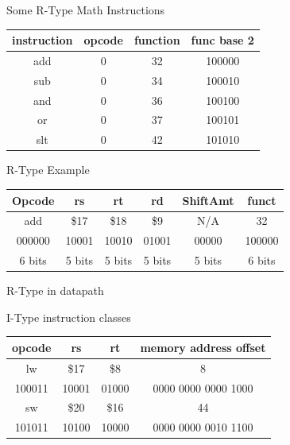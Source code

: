 \documentclass[landscape,fontscale=1,margin=0.2cm,paperwidth=60truecm, paperheight=34truecm,debug]{baposter}
\begin{document}
\begin{poster}
\begin{posterbox}[column=1,below=auto]{Some R-Type Math Instructions}
\begin{center}
\begin{tabular}{|c|c|c|c|}
\hline
instruction & opcode & function & func base 2\\\hline
add & 0 & 32 & 100000 \\\hline
sub & 0 & 34 & 100010 \\\hline
and & 0 & 36 & 100100 \\\hline
or & 0 & 37& 100101 \\\hline
slt & 0 & 42 & 101010 \\\hline

\end{tabular}
\end{center}
\end{posterbox}
\begin{posterbox}[column=1,below=auto]{R-Type Example}
\begin{center}
\begin{tabular}{|c|c|c|c|c|c|}
\hline
Opcode & rs & rt & rd & ShiftAmt & funct\\\hline
add & \$17 & \$18 & \$9 & N/A & 32\\\hline
000000 & 10001 & 10010 & 01001 & 00000 & 100000\\\hline
6 bits & 5 bits & 5 bits & 5 bits & 5 bits & 6 bits\\\hline 
\end{tabular}
\end{center}
\end{posterbox}
\begin{posterbox}[column=1,below=auto]{R-Type in datapath}
\begin{center}
\end{center}
\end{posterbox}
\begin{posterbox}[column=2,textborder=rounded]{I-Type instruction classes}
\begin{center}
\begin{tabular}{|c|c|c|c|}
\hline
opcode & rs & rt & memory address offset\\\hline\hline
lw & \$17 & \$8 & 8\\\hline
100011 & 10001& 01000 & 0000 0000 0000 1000\\\hline\hline
sw & \$20 & \$16 & 44\\\hline
101011 & 10100 & 10000 & 0000 0000 0010 1100\\\hline
\end{tabular}
\\


\end{center}
\end{posterbox}
\end{poster}
\end{document}
